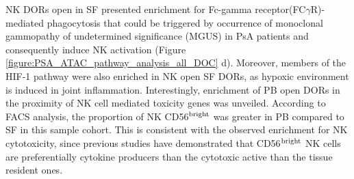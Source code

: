 NK DORs open in SF presented enrichment for Fc-gamma receptor(FC$\gamma$R)-mediated phagocytosis that could be triggered by occurrence of monoclonal gammopathy of undetermined significance (MGUS) in PsA patients and consequently induce NK activation (Figure \ref{figure:PSA_ATAC_pathway_analysis_all_DOC} d). Moreover, members of the HIF-1 pathway were also enriched in NK open SF DORs, as hypoxic environment is induced in joint inflammation. Interestingly, enrichment of PB open DORs in the proximity of NK cell mediated toxicity genes was unveiled. According to FACS analysis, the proportion of NK CD56$\textsuperscript{bright}$ was greater in PB compared to SF in this sample cohort. This is consistent with the observed enrichment for NK cytotoxicity, since previous studies have demonstrated that CD56$\textsuperscript{bright}$ NK cells are preferentially cytokine producers than the cytotoxic active than the tissue resident ones. 

